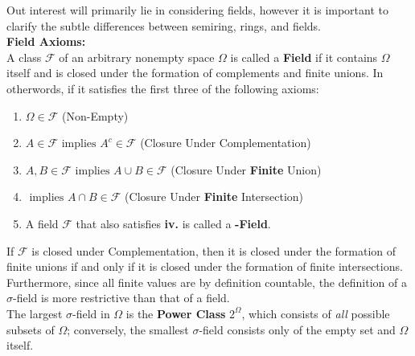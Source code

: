 \vspace{10pt}

Out interest will primarily lie in considering fields, however it is important to clarify the subtle differences between semiring, rings, and fields.\\


\textbf{Field Axioms:}\\
A class $\mathcal{F}$ of an arbitrary nonempty space $\Omega$ is called a \textbf{Field} if it contains $\Omega$ itself and is closed under the formation of complements and finite unions. In otherwords, if it satisfies the first three of the following axioms:
\vspace{2ex}
\begin{enumerate}[label=\textbf{\roman*.}, topsep=0pt, itemsep=-3pt]
	\item $\Omega \in \mathcal{F}$ \textcolor{mygrey}{(Non-Empty)}
	\item $A \in \mathcal{F} \text{ implies } A^c \in \mathcal{F}$ \textcolor{mygrey}{(Closure Under Complementation)}
	\item $A,B \in \mathcal{F} \text{ implies } A \cup B \in \mathcal{F}$ \textcolor{mygrey}{(Closure Under \textbf{Finite} Union)}
	\item[] \elbowarrow  $\text{ implies } A \cap B \in \mathcal{F}$ \textcolor{mygrey}{(Closure Under \textbf{Finite} Intersection)}
	      		\item[] \elbowarrow A field $\mathcal{F}$ that also satisfies \textbf{iv.} is called a \boldsymbol{$\sigma$}\textbf{-Field}. 
	      		\end{enumerate}
	      		\vspace{2ex}
	      		If $\mathcal{F}$ is closed under Complementation, then it is closed under the formation of finite unions if and only if it is closed under the formation of finite intersections. Furthermore, since all finite values are by definition countable, the definition of a $\sigma$-field is more restrictive than that of a field.\\[10pt]
	      		The largest $\sigma$-field in $\Omega$ is the \textbf{Power Class} $2^{\Omega}$, which consists of \textit{all} possible subsets of $\Omega$; conversely, the smallest $\sigma$-field consists only of the empty set and $\Omega$ itself.
                
